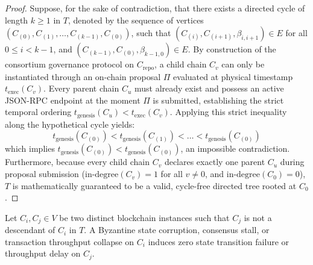 \begin{proof}
Suppose, for the sake of contradiction, that there exists a directed cycle of length $k \ge 1$ in $T$, denoted by the sequence of vertices $(C_{(0)}, C_{(1)}, \dots, C_{(k-1)}, C_{(0)})$, such that $(C_{(i)}, C_{(i+1)}, \beta_{i, i+1}) \in E$ for all $0 \le i < k-1$, and $(C_{(k-1)}, C_{(0)}, \beta_{k-1, 0}) \in E$. By construction of the consortium governance protocol on $C_{\text{repo}}$, a child chain $C_v$ can only be instantiated through an on-chain proposal $\Pi$ evaluated at physical timestamp $t_{\text{exec}}(C_v)$. Every parent chain $C_u$ must already exist and possess an active JSON-RPC endpoint at the moment $\Pi$ is submitted, establishing the strict temporal ordering $t_{\text{genesis}}(C_u) < t_{\text{exec}}(C_v)$. Applying this strict inequality along the hypothetical cycle yields:
\begin{equation}
t_{\text{genesis}}(C_{(0)}) < t_{\text{genesis}}(C_{(1)}) < \dots < t_{\text{genesis}}(C_{(0)})
\end{equation}
which implies $t_{\text{genesis}}(C_{(0)}) < t_{\text{genesis}}(C_{(0)})$, an impossible contradiction. Furthermore, because every child chain $C_v$ declares exactly one parent $C_u$ during proposal submission ($\text{in-degree}(C_v) = 1$ for all $v \neq 0$, and $\text{in-degree}(C_0) = 0$), $T$ is mathematically guaranteed to be a valid, cycle-free directed tree rooted at $C_0$.
\end{proof}

\begin{theorem}
\label{thm:isolation}
Let $C_i, C_j \in V$ be two distinct blockchain instances such that $C_j$ is not a descendant of $C_i$ in $T$. A Byzantine state corruption, consensus stall, or transaction throughput collapse on $C_i$ induces zero state transition failure or throughput delay on $C_j$.
\end{theorem}

